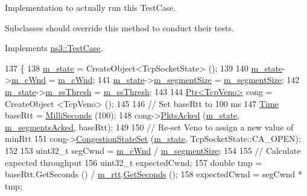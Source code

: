Implementation to actually run this Test\+Case. 

Subclasses should override this method to conduct their tests. 

Implements \hyperlink{classns3_1_1TestCase_a8ff74680cf017ed42011e4be51917a24}{ns3\+::\+Test\+Case}.


\begin{DoxyCode}
137 \{
138   \hyperlink{classTcpVenoTest_abb83a5490fca559c6233283e33a05c26}{m\_state} = CreateObject<TcpSocketState> ();
139 
140   \hyperlink{classTcpVenoTest_abb83a5490fca559c6233283e33a05c26}{m\_state}->\hyperlink{classns3_1_1TcpSocketState_a7cd3d2156a483c1db436097477a0fd7f}{m\_cWnd} = \hyperlink{classTcpVenoTest_aa65e90c7ba8b3f0779f2afbad9a383e1}{m\_cWnd};
141   \hyperlink{classTcpVenoTest_abb83a5490fca559c6233283e33a05c26}{m\_state}->\hyperlink{classns3_1_1TcpSocketState_a079872f7b0099ef5f3cab4ff47bd2edd}{m\_segmentSize} = \hyperlink{classTcpVenoTest_abd2a3231c1c2efc9aed967bc205a5ae2}{m\_segmentSize};
142   \hyperlink{classTcpVenoTest_abb83a5490fca559c6233283e33a05c26}{m\_state}->\hyperlink{classns3_1_1TcpSocketState_aec003b6dba9d269bfb1036c7652ffbd6}{m\_ssThresh} = \hyperlink{classTcpVenoTest_ab687dc972314acea4861c499a99ed5f1}{m\_ssThresh};
143 
144   \hyperlink{classns3_1_1Ptr}{Ptr<TcpVeno>} cong = CreateObject <TcpVeno> ();
145 
146   \textcolor{comment}{// Set baseRtt to 100 ms}
147   \hyperlink{classns3_1_1Time}{Time} baseRtt = \hyperlink{group__timecivil_gaf26127cf4571146b83a92ee18679c7a9}{MilliSeconds} (100);
148   cong->\hyperlink{classns3_1_1TcpVeno_a8270456c1a00231bd8c2282da8b99561}{PktsAcked} (\hyperlink{classTcpVenoTest_abb83a5490fca559c6233283e33a05c26}{m\_state}, \hyperlink{classTcpVenoTest_a7614249ca9888a1a8361554990318a2b}{m\_segmentsAcked}, baseRtt);
149 
150   \textcolor{comment}{// Re-set Veno to assign a new value of minRtt}
151   cong->\hyperlink{classns3_1_1TcpVeno_a39f34ca48e88063934c9c4f893d9c1dc}{CongestionStateSet} (\hyperlink{classTcpVenoTest_abb83a5490fca559c6233283e33a05c26}{m\_state}, TcpSocketState::CA\_OPEN);
152 
153   uint32\_t segCwnd = \hyperlink{classTcpVenoTest_aa65e90c7ba8b3f0779f2afbad9a383e1}{m\_cWnd} / \hyperlink{classTcpVenoTest_abd2a3231c1c2efc9aed967bc205a5ae2}{m\_segmentSize};
154 
155   \textcolor{comment}{// Calculate expected throughput}
156   uint32\_t expectedCwnd;
157   \textcolor{keywordtype}{double} tmp = baseRtt.GetSeconds () / \hyperlink{classTcpVenoTest_a0e786084324c078f6a58b8fdf0d61b60}{m\_rtt}.\hyperlink{classns3_1_1Time_a8f20d5c3b0902d7b4320982f340b57c8}{GetSeconds} ();
158   expectedCwnd = segCwnd * tmp;

\end{DoxyCode}
